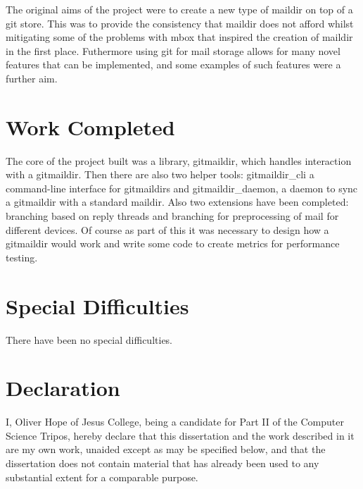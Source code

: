 \documentclass[12pt,a4paper,twoside,openright]{report}
\begin{document}
The original aims of the project were to create a new type of maildir on top of a git store. This was to provide the consistency that maildir does not afford whilst mitigating some of the problems with mbox that inspired the creation of maildir in the first place. Futhermore using git for mail storage allows for many novel features that can be implemented, and some examples of such features were a further aim.

\section*{Work Completed}

The core of the project built was a library, gitmaildir, which handles interaction with a gitmaildir. Then there are also two helper tools: gitmaildir\_cli a command-line interface for gitmaildirs and gitmaildir\_daemon, a daemon to sync a gitmaildir with a standard maildir. Also two extensions have been completed: branching based on reply threads and branching for preprocessing of mail for different devices. Of course as part of this it was necessary to design how a gitmaildir would work and write some code to create metrics for performance testing.

\section*{Special Difficulties}

There have been no special difficulties.

\newpage
\section*{Declaration}

I, Oliver Hope of Jesus College, being a candidate for Part II of the Computer
Science Tripos, hereby declare
that this dissertation and the work described in it are my own work,
unaided except as may be specified below, and that the dissertation
does not contain material that has already been used to any substantial
extent for a comparable purpose.

\bigskip
{}

\medskip
{}

\tableofcontents

\listoffigures

\newpage
\end{document}
